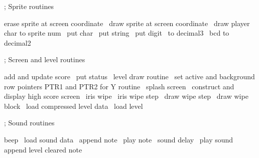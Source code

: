 \documentclass[10pt]{report}%
\begin{document}
\nwenddocs{}\plusendmoddef\nwstartdeflinemarkup{}\nwenddeflinemarkup

    ; Sprite routines

    \LA{}erase sprite at screen coordinate~{\nwtagstyle{}}\RA{}
    \LA{}draw sprite at screen coordinate~{\nwtagstyle{}}\RA{}
    \LA{}draw player~{\nwtagstyle{}}\RA{}
    \LA{}char to sprite num~{\nwtagstyle{}}\RA{}
    \LA{}put char~{\nwtagstyle{}}\RA{}
    \LA{}put string~{\nwtagstyle{}}\RA{}
    \LA{}put digit~{\nwtagstyle{}}\RA{}
    \LA{}to decimal3~{\nwtagstyle{}}\RA{}
    \LA{}bcd to decimal2~{\nwtagstyle{}}\RA{}

    ; Screen and level routines

    \LA{}add and update score~{\nwtagstyle{}}\RA{}
    \LA{}put status~{\nwtagstyle{}}\RA{}
    \LA{}level draw routine~{\nwtagstyle{}}\RA{}
    \LA{}set active and background row pointers \code{}PTR1\edoc{} and \code{}PTR2\edoc{} for \code{}Y\edoc{} routine~{\nwtagstyle{}}\RA{}
    \LA{}splash screen~{\nwtagstyle{}}\RA{}
    \LA{}construct and display high score screen~{\nwtagstyle{}}\RA{}
    \LA{}iris wipe~{\nwtagstyle{}}\RA{}
    \LA{}iris wipe step~{\nwtagstyle{}}\RA{}
    \LA{}draw wipe step~{\nwtagstyle{}}\RA{}
    \LA{}draw wipe block~{\nwtagstyle{}}\RA{}
    \LA{}load compressed level data~{\nwtagstyle{}}\RA{}
    \LA{}load level~{\nwtagstyle{}}\RA{}

    ; Sound routines

    \LA{}beep~{\nwtagstyle{}}\RA{}
    \LA{}load sound data~{\nwtagstyle{}}\RA{}
    \LA{}append note~{\nwtagstyle{}}\RA{}
    \LA{}play note~{\nwtagstyle{}}\RA{}
    \LA{}sound delay~{\nwtagstyle{}}\RA{}
    \LA{}play sound~{\nwtagstyle{}}\RA{}
    \LA{}append level cleared note~{\nwtagstyle{}}\RA{}
\end{document}
